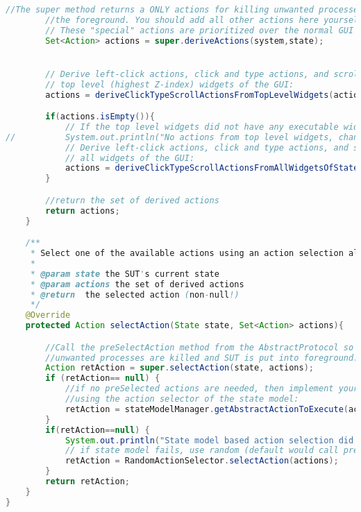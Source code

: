 \begin{lstlisting}[language=java, basicstyle=\tiny, caption=Protocol for the experiment application, label=code:protocol-experiment]
		//The super method returns a ONLY actions for killing unwanted processes if needed, or bringing the SUT to
		//the foreground. You should add all other actions here yourself.
		// These "special" actions are prioritized over the normal GUI actions in selectAction() / preSelectAction().
		Set<Action> actions = super.deriveActions(system,state);


		// Derive left-click actions, click and type actions, and scroll actions from
		// top level (highest Z-index) widgets of the GUI:
		actions = deriveClickTypeScrollActionsFromTopLevelWidgets(actions, system, state);

		if(actions.isEmpty()){
			// If the top level widgets did not have any executable widgets, try all widgets:
//			System.out.println("No actions from top level widgets, changing to all widgets.");
			// Derive left-click actions, click and type actions, and scroll actions from
			// all widgets of the GUI:
			actions = deriveClickTypeScrollActionsFromAllWidgetsOfState(actions, system, state);
		}

		//return the set of derived actions
		return actions;
	}

	/**
	 * Select one of the available actions using an action selection algorithm (for example random action selection)
	 *
	 * @param state the SUT's current state
	 * @param actions the set of derived actions
	 * @return  the selected action (non-null!)
	 */
	@Override
	protected Action selectAction(State state, Set<Action> actions){

		//Call the preSelectAction method from the AbstractProtocol so that, if necessary,
		//unwanted processes are killed and SUT is put into foreground.
		Action retAction = super.selectAction(state, actions);
		if (retAction== null) {
			//if no preSelected actions are needed, then implement your own action selection strategy
			//using the action selector of the state model:
			retAction = stateModelManager.getAbstractActionToExecute(actions);
		}
		if(retAction==null) {
			System.out.println("State model based action selection did not find an action. Using random action selection.");
			// if state model fails, use random (default would call preSelectAction() again, causing double actions HTML report):
			retAction = RandomActionSelector.selectAction(actions);
		}
		return retAction;
	}
}
\end{lstlisting}